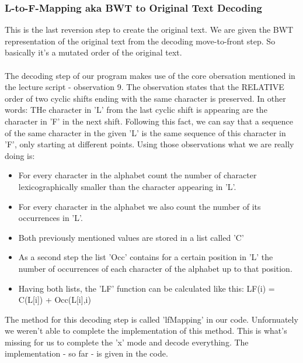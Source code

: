 \documentclass[11pt, notitlepage]{scrartcl}
\begin{document}
\subsubsection{L-to-F-Mapping aka BWT to Original Text Decoding}
This is the last reversion step to create the original text. We are given the BWT representation of the original text
from the decoding move-to-front step. So basically it's a mutated order of the original text. \\\\
The decoding step of our program makes use of the core obersation mentioned in the lecture script - observation 9. The
observation states that the RELATIVE order of two cyclic shifts ending with the same character is preserved. In other
words:
THe character in 'L' from the last cyclic shift is appearing are the character in 'F' in the next shift. Following this
fact, we can say that a sequence of the same character in the given 'L' is the same sequence of this character in 'F',
only starting at different points. Using those observations what we are really doing is: 
\begin{itemize}
    \item For every character in the alphabet count the number of character lexicographically smaller than the character
    appearing in 'L'.
    \item For every character in the alphabet we also count the number of its occurrences in 'L'.
    \item Both previously mentioned values are stored in a list called 'C'
    \item As a second step the list 'Occ' contains for a certain position in 'L' the number of occurrences of each
    character of the alphabet up to that position.
    \item Having both lists, the 'LF' function can be calculated like this: LF(i) = C(L[i]) + Occ(L[i],i)
\end{itemize}
The method for this decoding step is called 'lfMapping' in our code. Unfornuately we weren't able to complete the
implementation of this method. This is what's missing for us to complete the 'x' mode and decode everything. The
implementation - so far - is given in the code.
\end{document}
